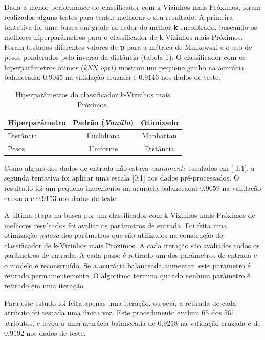 \documentclass[final,5p]{elsarticle}
\numberwithin{equation}{section}
\begin{document}
        Dada a menor performance do classificador com k-Vizinhos mais Próximos, foram realizados alguns testes para tentar melhorar o seu resultado. A primeira tentativa foi uma busca em grade ao redor do melhor \textbf{k} encontrado, buscando os melhores hiperparâmetros para o classificador de k-Vizinhos mais Próximos. Foram testados diferentes valores de \textbf{p} para a métrica de Minkowski e o uso de pesos ponderados pelo inverso da distância (tabela \ref{tab:parâmetros_knn}). O classificador com os hiperparâmetros ótimos (\emph{kNN opt1}) mostrou um pequeno ganho na acurácia balanceada: $0.9045$ na validação cruzada e $0.9146$ nos dados de teste.

        \begin{table}[h]
            \centering
            \begin{tabular}{l c c}
                \toprule
                \textbf{Hiperparâmetro} & \textbf{Padrão (\emph{Vanilla})}  & \textbf{Otimizado} \\
                \midrule
                Distância    & Euclidiana & Manhattan \\
                Pesos    & Uniforme & Distância \\
                \bottomrule
            \end{tabular}
            \caption{Hiperparâmetros do classificador k-Vizinhos mais Próximos.}
            \label{tab:parâmetros_knn}
        \end{table}

        Como alguns dos dados de entrada não estava \emph{exatamente} escalados em [-1;1], a segunda tentativa foi aplicar uma escala [0;1] aos dados pré-processados. O resultado foi um pequeno incremento na acurácia balanceada: $0.9059$ na validação cruzada e $0.9153$ nos dados de teste.

        A última etapa na busca por um classificador com k-Vizinhos mais Próximos de melhores resultados foi avaliar os parâmetros de entrada. Foi feita uma otimização \emph{gulosa} dos parâmetros que são utilizados na construção do classificador de k-Vizinhos mais Próximos. A cada iteração são avaliados todos os parâmetros de entrada. A cada passo é retirado um dos parâmetros de entrada e o modelo é reconstruído. Se a acurácia balanceada aumentar, este parâmetro é retirado permamentemente. O algoritmo termina quando nenhum parâmetro é retirado em uma iteração.

        Para este estudo foi feita apenas uma iteração, ou seja, a retirada de cada atributo foi testada uma única vez. Este procedimento excluiu 65 dos 561 atributos, e levou a uma acurácia balanceada de $0.9218$ na validação cruzada e de $0.9192$ nos dados de teste.
\end{document}
